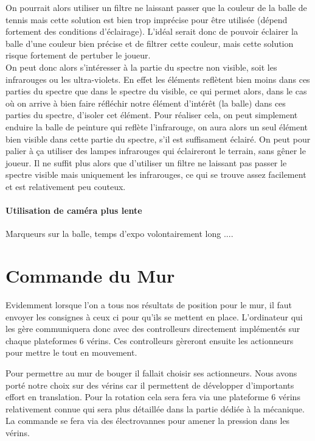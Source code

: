 On pourrait alors utiliser un filtre ne laissant passer que la couleur de la balle de tennis mais cette solution est bien trop imprécise pour être utilisée (dépend fortement des conditions d'éclairage). L'idéal serait donc de pouvoir éclairer la balle d'une couleur bien précise et de filtrer cette couleur, mais cette solution risque fortement de pertuber le joueur. \\

On peut donc alors s'intéresser à la partie du spectre non visible, soit les infrarouges ou les ultra-violets. En effet les éléments reflètent bien moins dans ces parties du spectre que dans le spectre du visible, ce qui permet alors, dans le cas où on arrive à bien faire réfléchir notre élément d'intérêt (la balle) dans ces parties du spectre, d'isoler cet élément. Pour réaliser cela, on peut simplement enduire la balle de peinture qui reflète l'infrarouge, on aura alors un seul élément bien visible dans cette partie du spectre, s'il est suffisament éclairé. On peut pour palier à ça utiliser des lampes infrarouges qui éclaireront le terrain, sans gêner le joueur. Il ne suffit plus alors que d'utiliser un filtre ne laissant pas passer le spectre visible mais uniquement les infrarouges, ce qui se trouve assez facilement et est relativement peu couteux.


\subsubsection{Utilisation de caméra plus lente}

Marqueurs sur la balle, temps d'expo volontairement long .... 



\chapter{Commande du Mur}

Evidemment lorsque l'on a tous nos résultats de position pour le mur, il faut envoyer les consignes à ceux ci pour qu'ils se mettent en place. L'ordinateur qui les gère communiquera donc avec des controlleurs directement implémentés sur chaque plateformes 6 vérins. Ces controlleurs gèreront ensuite les actionneurs pour mettre le tout en mouvement. 

Pour permettre au mur de bouger il fallait choisir ses actionneurs. Nous avons porté notre choix sur des vérins car il permettent de développer d'importants effort en translation. Pour la rotation cela sera fera via une plateforme 6 vérins relativement connue qui sera plus détaillée dans la partie dédiée à la mécanique. La commande se fera via des électrovannes pour amener la pression dans les vérins.

